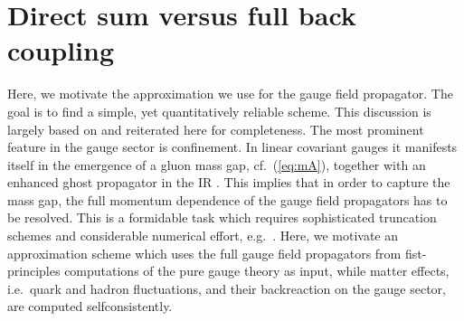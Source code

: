 \documentclass[%
reprint,
superscriptaddress,
showpacs,preprintnumbers,
 amsmath,amssymb,
 aps,
prd,
]{revtex4-1}
\def\eq#1{(\ref{#1})}
\begin{document}






\section{Direct sum versus full back coupling}\label{app:YMtoQCD}

Here, we motivate the approximation we use for the gauge field
propagator. The goal is to find a simple, yet quantitatively reliable
scheme. This discussion is largely based on \cite{Braun:2014ata,
  Rennecke:2015} and reiterated here for completeness. The most
prominent feature in the gauge sector is confinement. In linear
covariant gauges it manifests itself in the emergence of a gluon mass
gap, cf.\ \eq{eq:mA}, together with an enhanced ghost propagator in
the IR \cite{Gribov:1977wm, Kugo:1979gm, Zwanziger:2003cf}. This
implies that in order to capture the mass gap, the full momentum
dependence of the gauge field propagators has to be resolved. This is
a formidable task which requires sophisticated truncation schemes and
considerable numerical effort, e.g.\ \cite{Fischer:2008uz,
  Aguilar:2008xm, Boucaud:2008ky, Fister:2011uw, Mitter:2014wpa,
  Cyrol:2016tym, Cyrol:2017qkl}. Here, we motivate an approximation
scheme which uses the full gauge field propagators from
fist-principles computations of the pure gauge theory as input, while
matter effects, i.e.\ quark and hadron fluctuations, and their
backreaction on the gauge sector, are computed selfconsistently.
\end{document}
